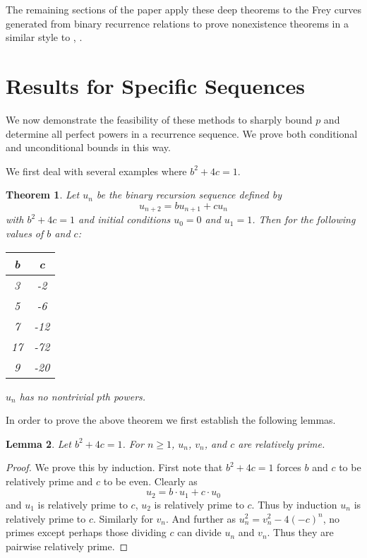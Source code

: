 \documentclass[12pt]{amsart}
\newtheorem{thm}{Theorem}[section]
\newtheorem{lem}[thm]{Lemma}
\theoremstyle{definition}
\begin{document}
The remaining sections of the paper apply these deep theorems to the Frey curves generated from binary recurrence relations to prove nonexistence theorems in a similar style to \cite{siksek06}, \cite{siksek05}.



\section{Results for Specific Sequences}

We now demonstrate the feasibility of these methods to sharply bound $p$ and determine all perfect powers in a recurrence sequence.  We prove both conditional and unconditional bounds in this way. 

We first deal with several examples where $b^2+4c = 1$.

\begin{thm}\label{noforms1}
Let $u_n$ be the binary recursion sequence defined by 
\[ u_{n+2} = bu_{n+1} +cu_n \]
with $b^2+4c = 1$ and initial conditions $u_0 = 0$ and $u_1=1$.  Then for the following values of $b$ and $c$:
\begin{center}
\begin{tabular}{c | c }
b & c \\  \hline \hline
3 & -2 \\
5 & -6  \\
7 & -12 \\
17 & -72  \\
9 & -20 \\ \hline \hline
\end{tabular}
\end{center}
$u_n$ has no nontrivial $p$th powers. %
\end{thm}

In order to prove the above theorem we first establish the following lemmas.

\begin{lem}\label{relprime}
Let $b^2+4c=1$.  For $n \geq 1$,  $u_n$, $v_n$, and $c$ are relatively prime.
\end{lem}

\begin{proof}
We prove this by induction.  First note that $b^2 +4c = 1$ forces $b$ and $c$ to be relatively prime and $c$ to be even.  Clearly as
\[ u_2 = b \cdot u_1 + c \cdot u_0 \]
and $u_1$ is relatively prime to $c$, $u_2$ is relatively prime to $c$.  Thus by induction $u_n$ is relatively prime to $c$.  Similarly for $v_n$.  And further as $u_n^2  = v_n^2 - 4(-c)^n$, no primes except perhaps those dividing $c$ can divide $u_n$ and $v_n$.  Thus they are pairwise relatively prime.
\end{proof}
\end{document}
